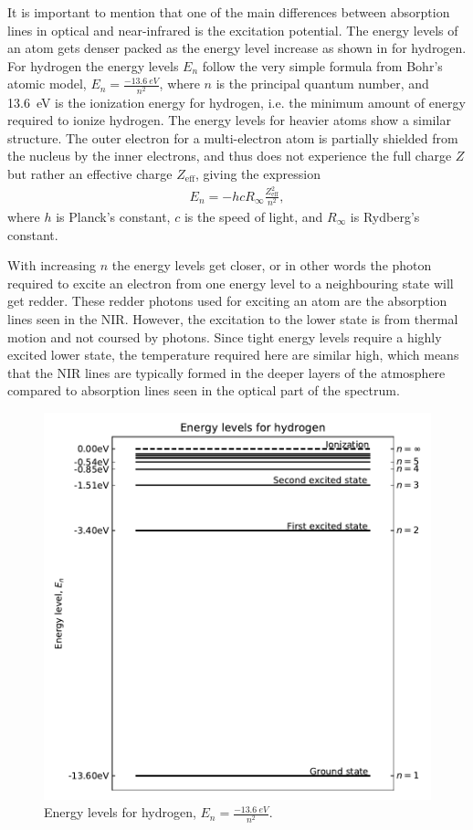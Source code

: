 It is important to mention that one of the main differences between absorption
lines in optical and near-infrared is the excitation potential. The energy
levels of an atom gets denser packed as the energy level increase as shown in
 for hydrogen. For hydrogen the energy levels $E_n$ follow the
very simple formula from Bohr's atomic model, $E_n=\frac{\SI{-13.6}{eV}}{n^2}$,
where $n$ is the principal quantum number, and \SI{13.6}{eV} is the ionization
energy for hydrogen, i.e. the minimum amount of energy required to ionize
hydrogen. The energy levels for heavier atoms show a similar structure. The
outer electron for a multi-electron atom is partially shielded from the nucleus
by the inner electrons, and thus does not experience the full charge $Z$ but
rather an effective charge $Z_\mathrm{eff}$, giving the expression
\begin{align}
  E_n = -hcR_\infty\frac{Z_\mathrm{eff}^2}{n^2},
\end{align}
where $h$ is Planck's constant, $c$ is the speed of light, and $R_\infty$ is
Rydberg's constant.

With increasing $n$ the energy levels get closer, or in other words the photon
required to excite an electron from one energy level to a neighbouring state
will get redder. These redder photons used for exciting an atom are the
absorption lines seen in the NIR. However, the excitation to the lower state is
from thermal motion and not coursed by photons. Since tight energy levels
require a highly excited lower state, the temperature required here are similar
high, which means that the NIR lines are typically formed in the deeper layers
of the atmosphere compared to absorption lines seen in the optical part of the
spectrum.

\begin{figure}[htpb!]
    \centering
    \includegraphics[width=1.0\linewidth]{figures/energyLevels.pdf}
    \caption{Energy levels for hydrogen, $E_n=\frac{\SI{-13.6}{eV}}{n^2}$.}
    \label{fig:elevel}
\end{figure}

